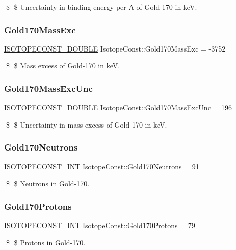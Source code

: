 \$ \$ Uncertainty in binding energy per A of Gold-\/170 in keV. \mbox{\label{group___isotope_const-_gold-_au170_ga873c91cb41f723bc2b0cc5b54d4e9ccc}} 
\subsubsection{\texorpdfstring{Gold170\+Mass\+Exc}{Gold170MassExc}}
{\footnotesize\ttfamily \mbox{\hyperlink{group___isotope_const-_macros_ga8f45a7272ce02c0b4c65c44636ed719a}{I\+S\+O\+T\+O\+P\+E\+C\+O\+N\+S\+T\+\_\+\+D\+O\+U\+B\+LE}} Isotope\+Const\+::\+Gold170\+Mass\+Exc = -\/3752}

\$ \$ Mass excess of Gold-\/170 in keV. \mbox{\label{group___isotope_const-_gold-_au170_ga744b42f4a91f3e4158309db6b853470e}} 
\subsubsection{\texorpdfstring{Gold170\+Mass\+Exc\+Unc}{Gold170MassExcUnc}}
{\footnotesize\ttfamily \mbox{\hyperlink{group___isotope_const-_macros_ga8f45a7272ce02c0b4c65c44636ed719a}{I\+S\+O\+T\+O\+P\+E\+C\+O\+N\+S\+T\+\_\+\+D\+O\+U\+B\+LE}} Isotope\+Const\+::\+Gold170\+Mass\+Exc\+Unc = 196}

\$ \$ Uncertainty in mass excess of Gold-\/170 in keV. \mbox{\label{group___isotope_const-_gold-_au170_ga1f4ba9b871b5be767ff20c504904aae9}} 
\subsubsection{\texorpdfstring{Gold170\+Neutrons}{Gold170Neutrons}}
{\footnotesize\ttfamily \mbox{\hyperlink{group___isotope_const-_macros_ga5f18360b3e99483a35c32d789e62621c}{I\+S\+O\+T\+O\+P\+E\+C\+O\+N\+S\+T\+\_\+\+I\+NT}} Isotope\+Const\+::\+Gold170\+Neutrons = 91}

\$ \$ Neutrons in Gold-\/170. \mbox{\label{group___isotope_const-_gold-_au170_gac7b4d257d7b3437b8e41b00cd636be9e}} 
\subsubsection{\texorpdfstring{Gold170\+Protons}{Gold170Protons}}
{\footnotesize\ttfamily \mbox{\hyperlink{group___isotope_const-_macros_ga5f18360b3e99483a35c32d789e62621c}{I\+S\+O\+T\+O\+P\+E\+C\+O\+N\+S\+T\+\_\+\+I\+NT}} Isotope\+Const\+::\+Gold170\+Protons = 79}

\$ \$ Protons in Gold-\/170. 